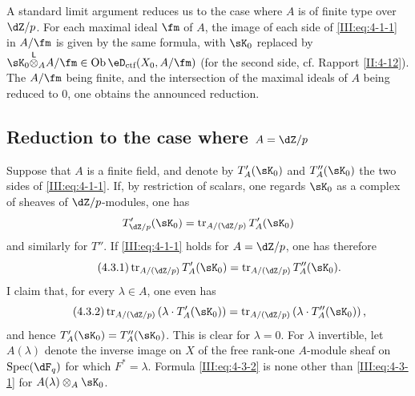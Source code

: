 A standard limit argument reduces us to the case where $A$ is
of finite type over $\dZ/p$. For each maximal ideal $\fm$ of $A$, the image of
each side of \eqref{III:eq:4-1-1} in $A/\fm$ is given by the same
formula, with $\sK_0$ replaced by
$\sK_0\lotimes_A A/\fm\in\ob\eD_\text{ctf}(X_0,A/\fm)$ (for the second side,
cf. Rapport \ref{II:4-12}). The $A/\fm$ being finite, and the intersection of the
maximal ideals of $A$ being reduced to $0$, one obtains the announced
reduction.




\subsection{Reduction to the case where \texorpdfstring{$A=\dZ/p$}{A=Z/p}}\label{III:4-3}

Suppose that $A$ is a finite field, and denote by $T_A'(\sK_0)$ and $T_A''(\sK_0)$
the two sides of \eqref{III:eq:4-1-1}. If, by restriction of scalars, one
regards $\sK_0$ as a complex of sheaves of $\dZ/p$-modules, one has
\[
  T_{\dZ/p}'(\sK_0) = \tr_{A/(\dZ/p)} T_A'(\sK_0)
\]
and similarly for $T''$. If \eqref{III:eq:4-1-1} holds for $A=\dZ/p$, one has therefore
\begin{equation*}\tag{4.3.1}\label{III:eq:4-3-1}
  \tr_{A/(\dZ/p)} T_A'(\sK_0) = \tr_{A/(\dZ/p)} T_A''(\sK_0) \text{.}
\end{equation*}
I claim that, for every $\lambda\in A$, one even has
\begin{equation*}\tag{4.3.2}\label{III:eq:4-3-2}
  \tr_{A/(\dZ/p)}\left(\lambda\cdot T_A'(\sK_0)\right) = \tr_{A/(\dZ/p)}\left(\lambda\cdot T_A''(\sK_0)\right) \text{,}
\end{equation*}
and hence $T_A'(\sK_0) = T_A''(\sK_0)$. This is clear for $\lambda=0$. For
$\lambda$ invertible, let $A(\lambda)$ denote the inverse image on $X$ of the
free rank-one $A$-module sheaf on $\spec(\dF_q)$ for which
$F^*=\lambda$. Formula \eqref{III:eq:4-3-2} is none other than
\eqref{III:eq:4-3-1} for $A(\lambda)\otimes_A \sK_0$.




